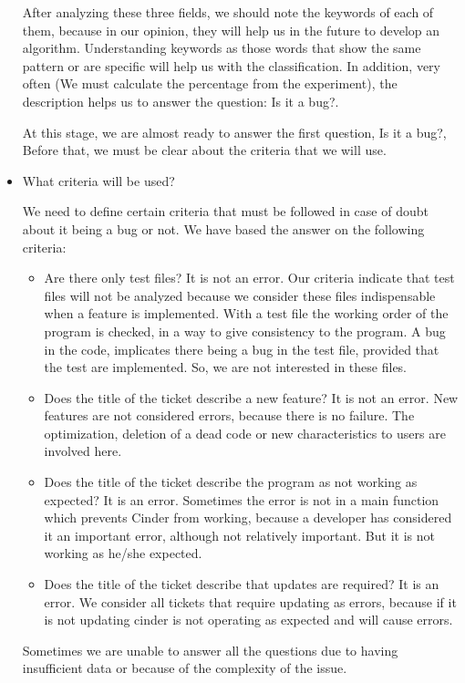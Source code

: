 \documentclass[a4paper]{article}
\begin{document}
\begin{itemize}
After analyzing these three fields,  we should note the keywords of each of them, because in our opinion, they will help us in the future to develop an algorithm. Understanding keywords as those words that show the same pattern or are specific will help us with the classification. In addition, very often (We must calculate the percentage from the experiment), the description helps us to answer the question: Is it a bug?.

At this stage, we are almost ready to answer the first question, Is it a bug?, Before that, we must be clear about the criteria that we will use. 

\item What criteria will be used?

We need to define certain criteria that must be followed in case of doubt about it being a bug or not. We have based the answer on the following criteria:

\begin{itemize}
    \item Are there only test files?
    It is not an error. Our criteria indicate that test files will not be analyzed because we consider these files indispensable when a feature is implemented. With a test file the working order of the program is checked, in a way to give consistency to the program. A bug in the code, implicates there being a bug in the test file, provided that the test are implemented. So, we are not interested in these files.
    \item Does the title of  the ticket describe a new feature?
It is not an error. New features are not considered errors, because there is no failure. The optimization, deletion of a dead code or new characteristics to users are involved here.
    \item Does the title of the ticket describe the program as not working as expected?
It is an error. Sometimes the error is not in a main function which prevents Cinder from working, because a developer has considered it  an important error, although not relatively important. But it is not working as he/she expected.
    \item Does the title of the ticket describe that updates are required?
It is an error.  We consider all tickets that require updating as errors, because if it is not updating  cinder is not operating as expected and will cause errors.
\end{itemize}

Sometimes we are unable to answer all the questions due to having insufficient data or because of the complexity of the issue.


\end{itemize}
\end{document}
